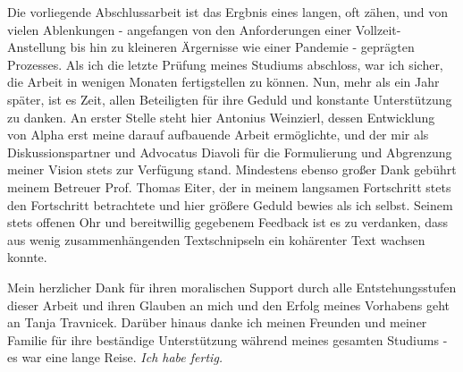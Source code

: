 \documentclass[draft,final]{vutinfth} %
\theoremstyle{definition}
\begin{document}
\frontmatter %

\addstatementpage

\begin{danksagung*}
Die vorliegende Abschlussarbeit ist das Ergbnis eines langen, oft zähen, und von vielen Ablenkungen - angefangen von den Anforderungen einer Vollzeit-Anstellung bis hin zu kleineren Ärgernisse wie einer Pandemie - geprägten Prozesses. Als ich die letzte Prüfung meines Studiums abschloss, war ich sicher, die Arbeit in wenigen Monaten fertigstellen zu können. Nun, mehr als ein Jahr später, ist es Zeit, allen Beteiligten für ihre Geduld und konstante Unterstützung zu danken. An erster Stelle steht hier Antonius Weinzierl, dessen Entwicklung von Alpha erst meine darauf aufbauende Arbeit ermöglichte, und der mir als Diskussionspartner und Advocatus Diavoli für die Formulierung und Abgrenzung meiner Vision stets zur Verfügung stand. Mindestens ebenso großer Dank gebührt meinem Betreuer Prof. Thomas Eiter, der in meinem langsamen Fortschritt stets den Fortschritt betrachtete und hier größere Geduld bewies als ich selbst. Seinem stets offenen Ohr und bereitwillig gegebenem Feedback ist es zu verdanken, dass aus wenig zusammenhängenden Textschnipseln ein kohärenter Text wachsen konnte.

Mein herzlicher Dank für ihren moralischen Support durch alle Entstehungsstufen dieser Arbeit und ihren Glauben an mich und den Erfolg meines Vorhabens geht an Tanja Travnicek. Darüber hinaus danke ich meinen Freunden und meiner Familie für ihre beständige Unterstützung während meines gesamten Studiums - es war eine lange Reise. \emph{Ich habe fertig.}
\end{danksagung*}
\end{document}
